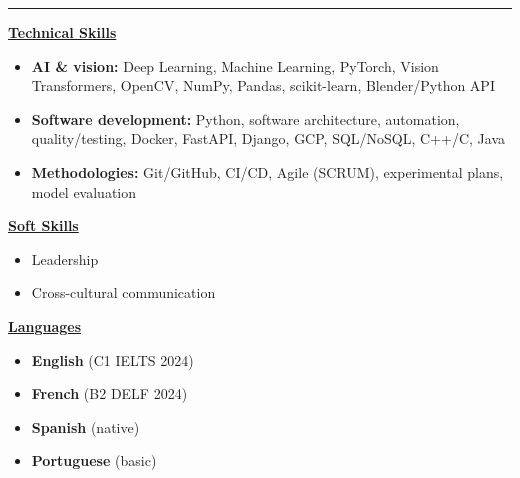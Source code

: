 \documentclass[letterpaper,10pt]{article}
\begin{document}

\vspace{4pt}
\noindent\rule{\textwidth}{0.4pt}
\vspace{0.4pt}

\noindent
\begin{minipage}[t]{0.60\textwidth}
  \raggedright
  \textbf{\underline{Technical Skills}}\\[-2pt]
  {\scriptsize
    \begin{itemize}[leftmargin=*,itemsep=1pt,parsep=0pt,topsep=0pt,partopsep=0pt]
      \item \textbf{AI \& vision:} Deep Learning, Machine Learning, PyTorch, Vision Transformers, OpenCV, NumPy, Pandas, scikit-learn, Blender/Python API
      \item \textbf{Software development:} Python, software architecture, automation, quality/testing, Docker, FastAPI, Django, GCP, SQL/NoSQL, C++/C, Java
      \item \textbf{Methodologies:} Git/GitHub, CI/CD, Agile (SCRUM), experimental plans, model evaluation
    \end{itemize}
  }

  \vspace{0.15cm}
  \textbf{\underline{Soft Skills}}\\[-2pt]
  {\scriptsize
    \begin{itemize}[leftmargin=*,itemsep=1pt,parsep=0pt,topsep=0pt,partopsep=0pt]
      \item Leadership
      \item Cross-cultural communication
    \end{itemize}
  }
\end{minipage}\hfill
\begin{minipage}[t]{0.36\textwidth}
  \raggedright
  \textbf{\underline{Languages}}\\[-2pt]
  {\scriptsize
    \begin{itemize}[leftmargin=*,itemsep=0pt,parsep=0pt,topsep=0pt,partopsep=0pt]
      \item \textbf{English} (C1 \textendash{} IELTS 2024)
      \item \textbf{French} (B2 \textendash{} DELF 2024)
      \item \textbf{Spanish} (native)
      \item \textbf{Portuguese} (basic)
    \end{itemize}
  }
\end{minipage}



\end{document}

